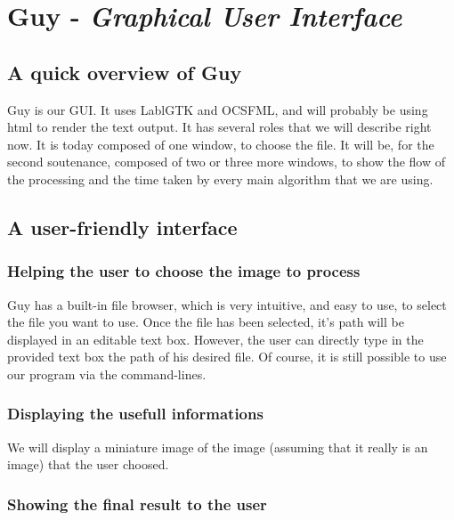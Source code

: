 \chapter{Guy - \emph{Graphical User Interface}}

\section{A quick overview of Guy}

Guy is our GUI. It uses LablGTK and OCSFML, and will probably be using html to render the text output. It has several roles that we will describe right now. It is today composed of one window, to choose the file. It will be, for the second soutenance, composed of two or three more windows, to show the flow of the processing and the time taken by every main algorithm that we are using. 

\begin{center}
\end{center}

\section{A user-friendly interface}

\subsection{Helping the user to choose the image to process}

Guy has a built-in file browser, which is very intuitive, and easy to use, to select the file you want to use. Once the file has been selected, it's path will be displayed in an editable text box. However, the user can directly type in the provided text box the path of his desired file. Of course, it is still possible to use our program via the command-lines.

\subsection{Displaying the usefull informations}

We will display a miniature image of the image (assuming that it really is an image) that the user choosed.

\subsection{Showing the final result to the user}

